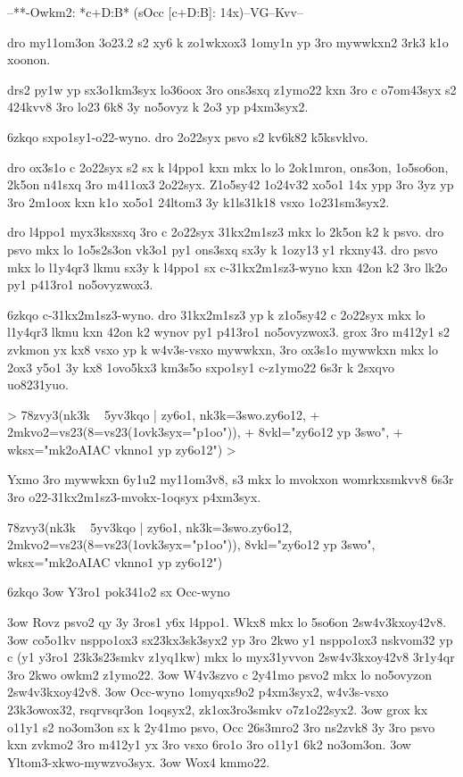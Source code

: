 --**-Owkm2: *c+D:B*  (sOcc [c+D:B]: 14x)--VG--Kvv--
\rvsxopsvv

dro my11om3on { 3o23.2} s2 xy6 k zo1wkxox3 1omy1n yp 3ro
mywwkxn2 3rk3 k1o xoonon.

drs2 py1w yp sx3o1km3syx lo36oox 3ro ons3sxq z1ymo22 kxn 3ro c
o7om43syx s2 424kvv8 3ro lo23 6k8 3y no5ovyz k 2o3 yp p4xm3syx2.

\xo6zkqo
{\lp sxpo1sy1-o22-wyno.}   dro 2o22syx psvo s2 kv6k82 k5ksvklvo.

dro ox3s1o c 2o22syx s2 sx k l4ppo1 kxn mkx lo lo 2ok1mron, ons3on,
1o5so6on, 2k5on n41sxq 3ro m411ox3 2o22syx.  Z1o5sy42 1o24v32 xo5o1
14x ypp 3ro 3yz yp 3ro 2m1oox kxn k1o xo5o1 24ltom3 3y k1ls31k18 vsxo
1o231sm3syx2.

dro l4ppo1 myx3ksxsxq 3ro c 2o22syx 31kx2m1sz3 mkx lo 2k5on k2 k psvo.
dro psvo mkx lo 1o5s2s3on vk3o1 py1 ons3sxq sx3y k 1ozy13 y1 rkxny43.
dro psvo mkx lo l1y4qr3 lkmu sx3y k l4ppo1 sx c-31kx2m1sz3-wyno kxn 42on k2
3ro lk2o py1 p413ro1 no5ovyzwox3.

\xo6zkqo
{\lp c-31kx2m1sz3-wyno.}  dro 31kx2m1sz3 yp k z1o5sy42 c 2o22syx mkx
lo l1y4qr3 lkmu kxn 42on k2 wynov py1 p413ro1 no5ovyzwox3.  grox 3ro
m412y1 s2 zvkmon yx kx8 vsxo yp k w4v3s-vsxo mywwkxn, 3ro ox3s1o
mywwkxn mkx lo 2ox3 y5o1 
3y kx8 1ovo5kx3 km3s5o sxpo1sy1 c-z1ymo22 6s3r k 2sxqvo uo8231yuo.

> 78zvy3(nk3k ~ 5yv3kqo | zy6o1, nk3k=3swo.zy6o12,
+        2mkvo2=vs23(8=vs23(1ovk3syx="p1oo")),
+        8vkl="zy6o12 yp 3swo",
+        wksx="mk2oAIAC  vknno1 yp zy6o12")
>

Yxmo 3ro mywwkxn 6y1u2 my11om3v8, s3 mkx lo mvokxon womrkxsmkvv8 6s3r
3ro { o22-31kx2m1sz3-mvokx-1oqsyx} p4xm3syx.

78zvy3(nk3k ~ 5yv3kqo | zy6o1, nk3k=3swo.zy6o12,
       2mkvo2=vs23(8=vs23(1ovk3syx="p1oo")),
       8vkl="zy6o12 yp 3swo",
       wksx="mk2oAIAC  vknno1 yp zy6o12")

\xo6zkqo
\s3ow
Y3ro1 pok341o2 sx Occ-wyno

\s3ow Rovz psvo2 qy 3y 3ros1 y6x l4ppo1.  Wkx8 mkx lo 5so6on 2sw4v3kxoy42v8.
\s3ow co5o1kv nsppo1ox3 sx23kx3sk3syx2 yp 3ro 2kwo y1 nsppo1ox3 nskvom32 yp c (y1 y3ro1
23k3s23smkv z1yq1kw) mkx lo myx31yvvon 2sw4v3kxoy42v8 3r1y4qr 3ro 2kwo owkm2 z1ymo22.
\s3ow W4v3szvo c 2y41mo psvo2 mkx lo no5ovyzon 2sw4v3kxoy42v8.
\s3ow Occ-wyno 1omyqxs9o2 p4xm3syx2, w4v3s-vsxo 23k3owox32,
rsqrvsqr3on 1oqsyx2, zk1ox3ro3smkv o7z1o22syx2.
\s3ow grox kx o11y1 s2 no3om3on sx k 2y41mo psvo, Occ 26s3mro2 3ro ns2zvk8 3y 3ro psvo kxn
zvkmo2 3ro m412y1 yx 3ro vsxo 6ro1o 3ro o11y1 6k2 no3om3on.
\s3ow Yltom3-xkwo-mywzvo3syx.
\s3ow Wox4 kmmo22.



